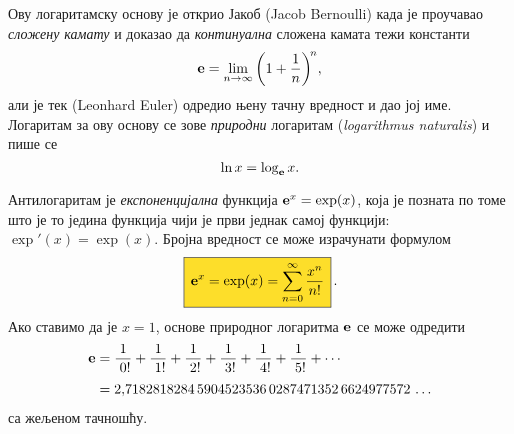 Ову логаритамску основу је открио Јакоб  (Jacob Bernoulli) када је
проучавао {\sl сложену камату\/} и доказао да {\sl континуална\/} сложена камата
тежи константи
$$
\e=\lim_{n\to\infty}\left(1+\frac1n\right)^{\!n}\!,\index{лимес}
$$
али је тек  (Leonhard Euler)
одредио њену тачну вредност и дао јој име.
Логаритам за ову основу се зове
{\sl природни\/} логаритам ({\sl logarithmus naturalis\/})
и пише се
$$
\ln x=\log_{\bf e} x.
$$

\def\ep{\hphantom{!}}
\def\rf#1!{\frac1{\hphantom{!}#1!}}
Антилогаритам је {\sl експоненцијална\/} функција ${\bf e}^x=\exp(x)$, 
која је позната по томе што је то
једина функција чији је први
 једнак самој функцији: $\exp'(x)=\exp(x)$. 
Бројна вредност се може израчунати формулом
\begin{equation}
\label{eq:exp}\index{формула}
\okvir{\e^x=\exp(x)=\sum_{n=0}^\infty\frac{x^n}{n!}}.
\end{equation}%
Ако ставимо да је $x=1$,
 основе природног логаритма ${\bf e}$ се може одредити
\begin{equation}\label{eq:e}
\begin{split}
\e
&=\rf0!+\rf1!+\rf2!+\rf3!+\rf4!+\rf5!+\cdots\\
\noalign{\smallskip}
&=2\.
7182818284\,
5904523536\,
0287471352\,
6624977572\,\ldots
\end{split}
\end{equation}
са жељеном тачношћу.
